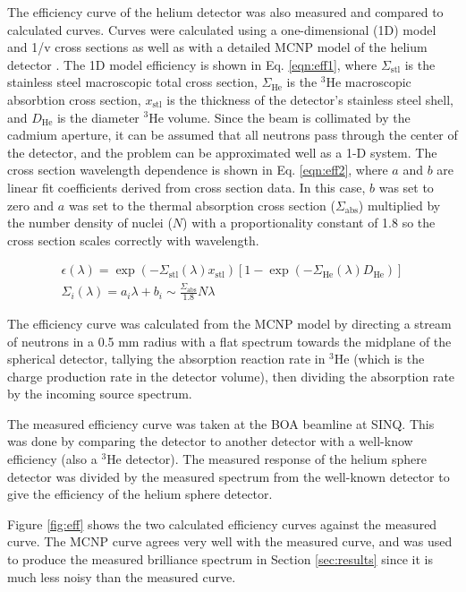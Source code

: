 \documentclass[5p,12pt]{elsarticle}
\begin{document}
The efficiency curve of the helium detector was also measured and compared to calculated curves.  Curves were calculated using a one-dimensional (1D) model and 1/v cross sections as well as with a detailed MCNP model of the helium detector \cite{bonner_manual}.  The 1D model efficiency is shown in Eq. \ref{eqn:eff1}, where $\Sigma_{\textrm{stl}}$ is the stainless steel macroscopic total cross section, $\Sigma_{\textrm{He}}$ is the $^3$He macroscopic absorbtion cross section, $x_{\textrm{stl}}$ is the thickness of the detector's stainless steel shell, and  $D_{\textrm{He}}$ is the diameter $^3$He volume.  Since the beam is collimated by the cadmium aperture, it can be assumed that all neutrons pass through the center of the detector, and the problem can be approximated well as a 1-D system.  The cross section wavelength dependence is shown in Eq. \ref{eqn:eff2}, where $a$ and $b$ are linear fit coefficients derived from cross section data.  In this case, $b$ was set to zero and $a$ was set to the thermal absorption cross section ($\Sigma_{\textrm{abs}}$) multiplied by the number density of nuclei ($N$) with a proportionality constant of 1.8 so the cross section scales correctly with wavelength.

\begin{gather}
     \label{eqn:eff1} \epsilon(\lambda) = \exp \left(-\Sigma_{\textrm{stl}}(\lambda) x_{\textrm{stl}}\right)[1-\exp(-\Sigma_{\textrm{He}}(\lambda) D_{\textrm{He}})] \\
     \label{eqn:eff2} \Sigma_i(\lambda) = a_i\lambda+b_i  \sim  \frac{\Sigma_{\textrm{abs}}}{1.8} N \lambda 
\end{gather}

The efficiency curve was calculated from the MCNP model by directing a stream of neutrons in a 0.5 mm radius with a flat spectrum towards the midplane of the spherical detector, tallying the absorption reaction rate in $^{3}$He (which is the charge production rate in the detector volume), then dividing the absorption rate by the incoming source spectrum.  

The measured efficiency curve was taken at the BOA beamline at SINQ.  This was done by comparing the detector to another detector with a well-know efficiency (also a $^3$He detector).  The measured response of the helium sphere detector was divided by the measured spectrum  from the well-known detector to give the efficiency of the helium sphere detector.

Figure \ref{fig:eff} shows the two calculated efficiency curves against the measured curve.  The MCNP curve agrees very well with the measured curve, and was used to produce the measured brilliance spectrum in Section \ref{sec:results} since it is much less noisy than the measured curve.
\end{document}
